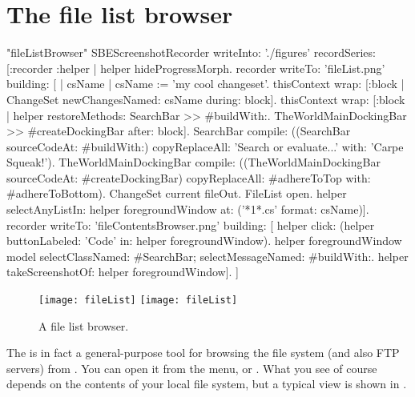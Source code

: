 \documentclass[a4paper,10pt,twoside]{book}
\begin{document}
\section{The file list browser}

\begin{ExecuteSmalltalkScript}"fileListBrowser"
SBEScreenshotRecorder writeInto: './figures' recordSeries: [:recorder :helper |
	helper hideProgressMorph.
	recorder writeTo: 'fileList.png' building: [
		| csName |
		csName := 'my cool changeset'.
		thisContext wrap: [:block | ChangeSet newChangesNamed: csName during: block].
		thisContext wrap: [:block | helper restoreMethods: {SearchBar >> #buildWith:. TheWorldMainDockingBar >> #createDockingBar} after: block].
		SearchBar compile: ((SearchBar sourceCodeAt: #buildWith:)
			copyReplaceAll: 'Search or evaluate...' with: 'Carpe Squeak!').
		TheWorldMainDockingBar compile: ((TheWorldMainDockingBar sourceCodeAt: #createDockingBar)
			copyReplaceAll: #adhereToTop with: #adhereToBottom).
		ChangeSet current fileOut.
		FileList open.
		helper selectAnyListIn: helper foregroundWindow at: ('*{1}*.cs' format: {csName})].
	recorder writeTo: 'fileContentsBrowser.png' building: [
		helper click: (helper buttonLabeled: 'Code' in: helper foregroundWindow).
		helper foregroundWindow model
			selectClassNamed: #SearchBar;
			selectMessageNamed: #buildWith:.
		helper takeScreenshotOf: helper foregroundWindow].
]
\end{ExecuteSmalltalkScript}
\begin{figure}[btp]
	\begin{center}
	\ifluluelse
		{\texttt{[image: fileList]}}
		{\texttt{[image: fileList]}}
	\end{center}
	\caption{A file list browser.}
	\label{fig:fileList}
\end{figure}

The  is in fact a general-purpose tool for browsing the file system (and also FTP servers) from \sq.
You can open it from the  menu, or .
What you see of course depends on the contents of your local file system, but a typical view is shown in .
\end{document}
